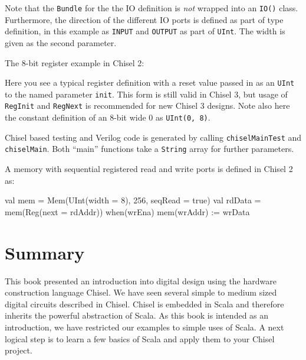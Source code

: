 \documentclass[%
    10pt,
    headinclude, footexclude,
    openright, %
    notitlepage,
    cleardoubleempty,
    headsepline,
    pointlessnumbers,
    bibtotoc, idxtotoc,
    ]{scrbook}
\newcommand{\code}[1]{{\small{\texttt{#1}}}}
\begin{document}
Note that the \code{Bundle} for the the IO definition is \emph{not} wrapped into
an \code{IO()} class.  Furthermore, the direction of the different IO ports is defined
as part of type definition, in this example as \code{INPUT} and \code{OUTPUT}
as part of \code{UInt}. The width is given as the second parameter.

\begin{minipage}{\linewidth}
The 8-bit register example in Chisel 2:

\end{minipage}

Here you see a typical register definition with a reset value passed in as
an \code{UInt} to the named parameter \code{init}. This form is still valid in Chisel 3,
but usage of \code{RegInit} and \code{RegNext} is recommended for new Chisel 3 designs.
Note also here the constant definition of an 8-bit wide 0 as \code{UInt(0, 8)}.

Chisel based testing and Verilog code is generated by calling \code{chiselMainTest}
and \code{chiselMain}. Both ``main'' functions take a \code{String} array for further parameters.



A memory with sequential registered read and write ports is defined in Chisel 2 as:

\begin{chisel}
  val mem = Mem(UInt(width = 8), 256, seqRead = true)
  val rdData = mem(Reg(next = rdAddr))
  when(wrEna) {
    mem(wrAddr) := wrData
  }
\end{chisel}





\chapter{Summary}
\label{sec:conclusion}

This book presented an introduction into digital design using the
hardware construction language Chisel.
We have seen several simple to medium sized digital circuits
described in Chisel.
Chisel is embedded in Scala and therefore inherits the powerful
abstraction of Scala.
As this book is intended as an introduction, we have restricted
our examples to simple uses of Scala.
A next logical step is to learn a few basics of Scala and apply them
to your Chisel project.
\end{document}
